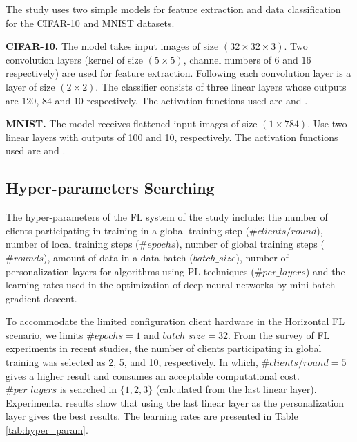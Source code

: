 \documentclass[runningheads]{llncs}
\begin{document}
The study uses two simple models for feature extraction and data classification for the CIFAR-10 and MNIST datasets.

\textbf{CIFAR-10.} The model takes input images of size $(32\times32\times3)$. Two convolution layers (kernel of size $(5\times5)$, channel numbers of $6$ and $16$ respectively) are used for feature extraction. Following each convolution layer is a  layer of size $(2\times2)$. The classifier consists of three linear layers whose outputs are $120$, $84$ and $10$ respectively. The activation functions used are  and .

\textbf{MNIST.} The model receives flattened input images of size $(1\times784)$. Use two linear layers with outputs of 100 and 10, respectively. The activation functions used are  and .

\subsection{Hyper-parameters Searching}

The hyper-parameters of the FL system of the study include: the number of clients participating in training in a global training step ($\#clients/round$), number of local training steps ($\#epochs $), number of global training steps ($\#rounds$), amount of data in a data batch ($batch\_size$), number of personalization layers for algorithms using PL techniques ($\# per\_layers$) and the learning rates used in the optimization of deep neural networks by mini batch gradient descent.

To accommodate the limited configuration client hardware in the Horizontal FL scenario, we limits $\#epochs=1$ and $batch\_size=32$. From the survey of FL experiments in recent studies, the number of clients participating in global training was selected as 2, 5, and 10, respectively. In which, $\#clients/round=5$ gives a higher result and consumes an acceptable computational cost. $\#per\_layers$ is searched in $\{1,2,3\}$ (calculated from the last linear layer). Experimental results show that using the last linear layer as the personalization layer gives the best results. The learning rates are presented in Table \ref{tab:hyper_param}.

\end{document}
